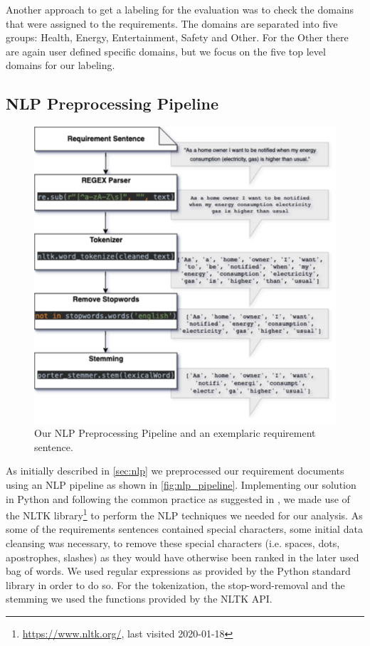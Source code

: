 Another approach to get a labeling for the evaluation was to check the domains that were assigned to the requirements. The domains are separated into five groups: Health, Energy, Entertainment, Safety and Other. For the \grqq{}Other\grqq{} there are again user defined specific domains, but we focus on the five top level domains for our labeling.

\subsection{NLP Preprocessing Pipeline} %
\label{sub:own_pipeline}

\begin{figure}[ht]
  \centering
    \includegraphics[width=\textwidth]{figures/NLP Pipeline.png}
    \caption{Our NLP Preprocessing Pipeline and an exemplaric requirement sentence.}
    \label{fig:nlp_pipeline}
\end{figure}

As initially described in \autoref{sec:nlp} we preprocessed our requirement documents using an NLP pipeline as shown in \autoref{fig:nlp_pipeline}. Implementing our solution in Python and following the common practice as suggested in \cite{ferrari_natural_2018}, we made use of the NLTK library\footnote{\url{https://www.nltk.org/}, last visited 2020-01-18} to perform the NLP techniques we needed for our analysis. As some of the requirements sentences contained special characters, some initial data cleansing was necessary, to remove these special characters (i.e. spaces, dots, apostrophes, slashes) as they would have otherwise been ranked in the later used bag of words. We used regular expressions as provided by the Python standard library in order to do so. For the tokenization, the stop-word-removal and the stemming we used the functions provided by the NLTK API.


